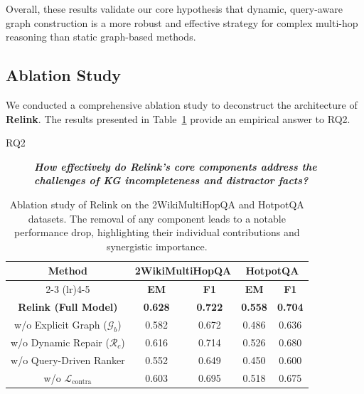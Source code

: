 \documentclass[letterpaper]{article} %
\begin{document}
Overall, these results validate our core hypothesis that dynamic, query-aware graph construction is a more robust and effective strategy for complex multi-hop reasoning than static graph-based methods.

\subsection{Ablation Study}
We conducted a comprehensive ablation study to deconstruct the architecture of \textbf{Relink}. The results presented in Table~\ref{tab:ablation} provide an empirical answer to RQ2.

\begin{description}
    \item[RQ2] \textit{\textbf{How effectively do Relink's core components address the challenges of KG incompleteness and distractor facts?}}
    \vspace{-0.5em}
\end{description}

\begin{table}[h]
\centering
\scriptsize
\begin{tabular}{c@{\hskip 12pt}c@{\hskip 8pt}c@{\hskip 12pt}c@{\hskip 8pt}c}
\toprule
\multirow{2}{*}{\textbf{Method}} & \multicolumn{2}{c}{\textbf{2WikiMultiHopQA}} & \multicolumn{2}{c}{\textbf{HotpotQA}} \\
\cmidrule(lr){2-3} \cmidrule(lr){4-5}
& \textbf{EM} & \textbf{F1} & \textbf{EM} & \textbf{F1} \\
\midrule
\textbf{Relink (Full Model)}
& \textbf{0.628} & \textbf{0.722}
& \textbf{0.558} & \textbf{0.704} \\
\midrule
\quad w/o Explicit Graph ($\mathcal{G}_b$)
& 0.582 & 0.672
& 0.486 & 0.636 \\
\quad w/o Dynamic Repair ($\mathcal{R}_c$)
& 0.616 & 0.714
& 0.526 & 0.680 \\
\quad w/o Query-Driven Ranker
& 0.552 & 0.649
& 0.450 & 0.600 \\

\quad w/o $\mathcal{L}_{\text{contra}}$
& 0.603 & 0.695
& 0.518 & 0.675 \\
\bottomrule
\end{tabular}
\caption{Ablation study of Relink on the 2WikiMultiHopQA and HotpotQA datasets. The removal of any component leads to a notable performance drop, highlighting their individual contributions and synergistic importance.}
\label{tab:ablation}
\end{table}
\end{document}
